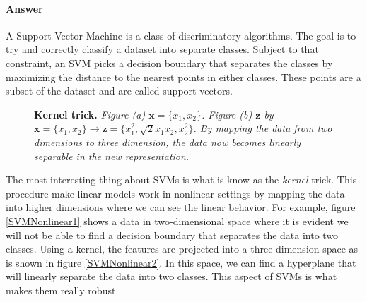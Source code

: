 \documentclass[12pt]{article}
\renewcommand{\vec}[1]{\mathbf{#1}}
\begin{document}
\paragraph{\textbf{Answer}} A Support Vector Machine is a class of discriminatory algorithms. The goal is to try and correctly classify a dataset into separate classes. Subject to that constraint, an SVM  picks a decision boundary that separates the classes by maximizing the distance to the nearest points in either classes. These points are a subset of the dataset and are called support vectors. 


\begin{figure}[!hbtp]
\centering
    \caption{\textbf{Kernel trick.} \textit{Figure (a) $\vec{x} = \{x_1,x_2\}$. Figure (b) $\vec{z}$ by $\vec{x} = \{x_1,x_2\} \longrightarrow \vec{z} = \{x_1^2, \sqrt2x_1x_2, x_2^2 \}$. By mapping the data from two dimensions to three dimension, the data now becomes linearly separable in the new representation.}}
\end{figure}

The most interesting thing about SVMs is what is know as the \textit{kernel} trick. This procedure make linear models work in nonlinear settings by mapping the data into higher dimensions where we can see the linear behavior. For example, figure \ref{SVMNonlinear1} shows a data in two-dimensional space where it is evident we will not be able to find a decision boundary that separates the data into two classes. Using a kernel, the features are projected into a three dimension space as is shown in figure \ref{SVMNonlinear2}. In this space, we can find a hyperplane that will linearly separate the data into two classes. This aspect of SVMs is what makes them really robust.
\end{document}
